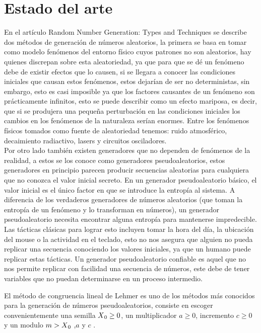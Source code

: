 \documentclass[conference,a4paper]{IEEEtran}
\begin{document}
\section{\textbf{Estado del arte}}
En el art\'iculo Random Number Generation: Types and Techniques \cite{b1} se describe dos m\'etodos de generaci\'on de n\'umeros aleatorios, la primera se basa en tomar como modelo fen\'omenos del entorno f\'isico cuyos patrones no son aleatorios, hay quienes discrepan sobre esta aleatoriedad, ya que para que se d\'e un fen\'omeno debe de existir efectos que lo causen, si se llegara a conocer las condiciones iniciales que causan estos fen\'omenos, estos dejar\'ian de ser no deterministas, sin embargo, esto es casi imposible ya que los factores causantes de un fen\'omeno son pr\'acticamente infinitos, esto se puede describir como un efecto mariposa, es decir, que si se produjera una peque\~na perturbaci\'on en las condiciones iniciales los cambios en los fen\'omenos de la naturaleza ser\'ian enormes. Entre los fen\'omenos f\'isicos tomados como fuente de aleatoriedad tenemos: ruido atmosf\'erico, decaimiento radiactivo, lasers y circuitos osciladores.\\
Por otro lado tambi\'en existen generadores que no dependen de fen\'omenos de la realidad, a estos se los conoce como generadores pseudoaleatorios, estos generadores en principio parecen producir secuencias aleatorias para cualquiera que no conozca el valor inicial secreto. En un generador pseudoaleatorio b\'asico, el valor inicial es el \'unico factor en que se introduce la entrop\'ia al sistema. A diferencia de los verdaderos generadores de n\'umeros aleatorios (que toman la entrop\'ia de un fen\'omeno y lo transforman en n\'umeros), un generador pseudoaleatorio necesita encontrar alguna entrop\'ia para mantenerse impredecible. Las t\'acticas cl\'asicas para lograr esto incluyen tomar la hora del d\'ia, la ubicaci\'on del mouse o la actividad en el teclado, esto no nos asegura que alguien no pueda replicar una secuencia conociendo los valores iniciales, ya que un humano puede replicar estas t\'acticas. Un generador pseudoaleatorio confiable es aquel que no nos permite replicar con facilidad una secuencia de n\'umeros, este debe de tener variables que no puedan determinarse en un proceso intermedio.

El m\'etodo de congruencia lineal de Lehmer es uno de los m\'etodos m\'as conocidos para la generaci\'on de n\'umeros pseudoaleatorios, consiste en escoger convenientemente una semilla $X\textsubscript{0}\geq 0$, un multiplicador $a \geq 0$, incremento $c \geq 0$ y un modulo $m >X\textsubscript{0}$ ,$a$ y $c$ .
\end{document}
